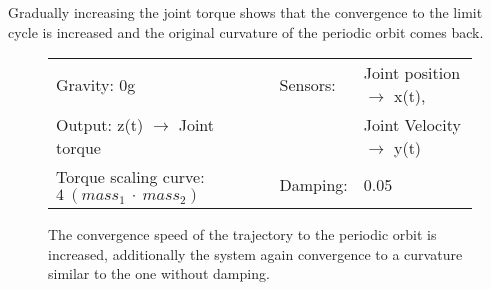 \documentclass[main]{subfiles}
\begin{document}
Gradually increasing the joint torque shows that the convergence to the limit cycle is increased and the original curvature of the periodic orbit comes back.

\begin{figure}[H]
	\centering
	\begin{minipage}{1.3\textwidth}
	\hspace*{-5em}
	\end{minipage}
	\caption[Damped, torque increased, limited chaotic controller controlling model leg]{The convergence speed of the trajectory to the periodic orbit is increased, additionally the system again convergence to a curvature similar to the one without damping.}
	\begin{tabular}{l|ll}
	\hline 
	Gravity: 0g  & Sensors: & Joint position \(\rightarrow\) x(t),\\
	 Output: z(t) \(\rightarrow\) Joint torque &  & Joint Velocity \(\rightarrow\) y(t) \\
	  Torque scaling curve: \(4~(mass_1~\cdot~mass_2)\) & Damping: & 0.05 \\
	  \hline
	\end{tabular}

	\label{figure:limited-damped-model-leg-damping2}
\end{figure}
\end{document}
